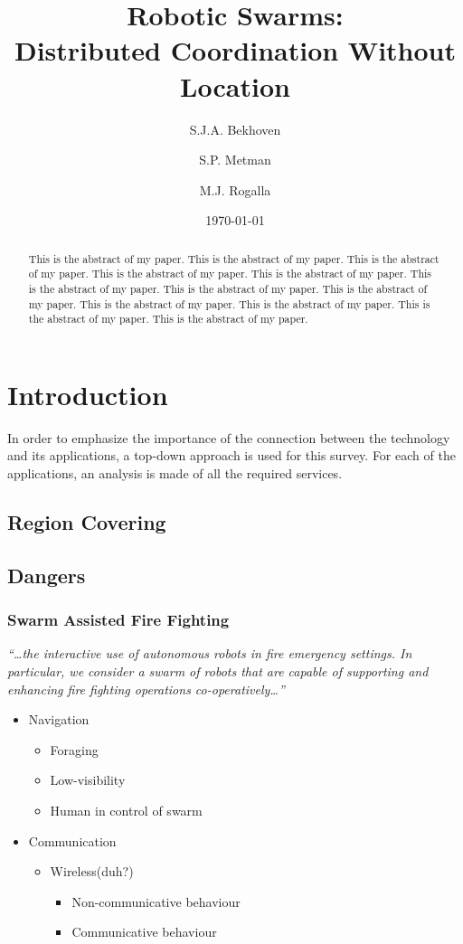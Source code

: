 \documentclass[a4paper]{article}
\title{Robotic Swarms: \\Distributed Coordination Without Location}
\author{S.J.A. Bekhoven  \and
    S.P. Metman \and
    M.J. Rogalla}
\date{\today}
\begin{document}
\maketitle
\thispagestyle{empty}

\begin{abstract}
This is the abstract of my paper.
This is the abstract of my paper.
This is the abstract of my paper.
This is the abstract of my paper.
This is the abstract of my paper.
This is the abstract of my paper.
This is the abstract of my paper.
This is the abstract of my paper.
This is the abstract of my paper.
This is the abstract of my paper.
This is the abstract of my paper.
This is the abstract of my paper.
\end{abstract}


\section{Introduction}
  In order to emphasize the importance of the connection between the technology and its applications, a top-down approach is used for this survey. For each of the applications, an analysis is made of all the required services.

  \subsection{Region Covering}
  \subsection{Dangers}
  \subsubsection{Swarm Assisted Fire Fighting}
  \emph{``\ldots the interactive use of autonomous robots in fire emergency settings. In particular, we consider a swarm of robots that are capable of supporting and enhancing fire fighting operations co-operatively\ldots''\cite{Naghsh2008}}
  \begin{itemize}
    \item Navigation
      \begin{itemize}
        \item Foraging
        \item Low-visibility
        \item Human in control of swarm
      \end{itemize}
    \item Communication
    \begin{itemize}
        \item Wireless(duh?)
        \begin{itemize}
          \item Non-communicative behaviour
          \item Communicative behaviour
        \end{itemize}
      \end{itemize}
  \end{itemize}
\end{document}
